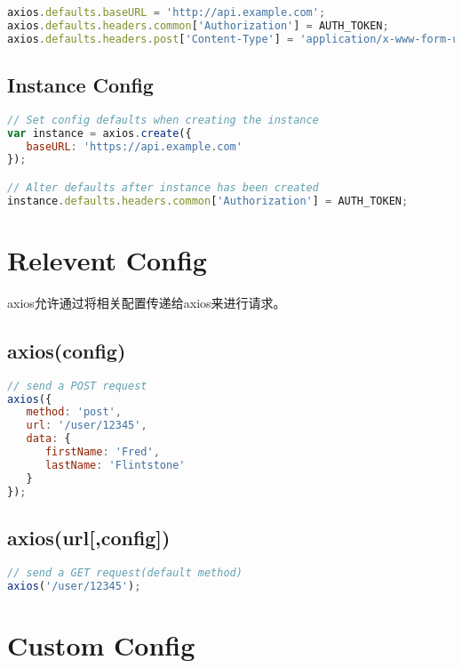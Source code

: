 \begin{lstlisting}[language=JavaScript]
axios.defaults.baseURL = 'http://api.example.com';
axios.defaults.headers.common['Authorization'] = AUTH_TOKEN;
axios.defaults.headers.post['Content-Type'] = 'application/x-www-form-urlencoded';
\end{lstlisting}

\subsection{Instance Config}





\begin{lstlisting}[language=JavaScript]
// Set config defaults when creating the instance
var instance = axios.create({
   baseURL: 'https://api.example.com'
});

// Alter defaults after instance has been created
instance.defaults.headers.common['Authorization'] = AUTH_TOKEN;
\end{lstlisting}




\section{Relevent Config}


axios允许通过将相关配置传递给axios来进行请求。

\subsection{axios(config)}


\begin{lstlisting}[language=JavaScript]
// send a POST request
axios({
   method: 'post',
   url: '/user/12345',
   data: {
      firstName: 'Fred',
      lastName: 'Flintstone'
   }
});
\end{lstlisting}

\subsection{axios(url[,config])}



\begin{lstlisting}[language=JavaScript]
// send a GET request(default method)
axios('/user/12345');
\end{lstlisting}

\section{Custom Config}

